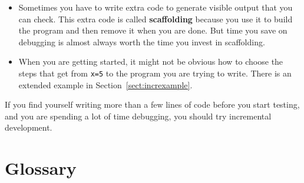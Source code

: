 \documentclass[
]{book}
\numberwithin{Answer}{chapter}
\numberwithin{Exercise}{chapter}
\begin{document}
\begin{itemize}

\item Sometimes you have to write extra code to
generate visible output that you can check.  This extra code is
called {\bf scaffolding} because you use it to build the program
and then remove it when you are done.  But time you save on
debugging is almost always worth the time you invest in
scaffolding.


\item When you are getting started, it might not be obvious how to
choose the steps that get from {\tt x=5} to the program you are trying
to write.  There is an extended example in Section~\ref{sect:increxample}.

\end{itemize}

If you find yourself writing more than a few lines of code before
you start testing, and you are spending a lot of time debugging,
you should try incremental development.


\section{Glossary}
\end{document}
